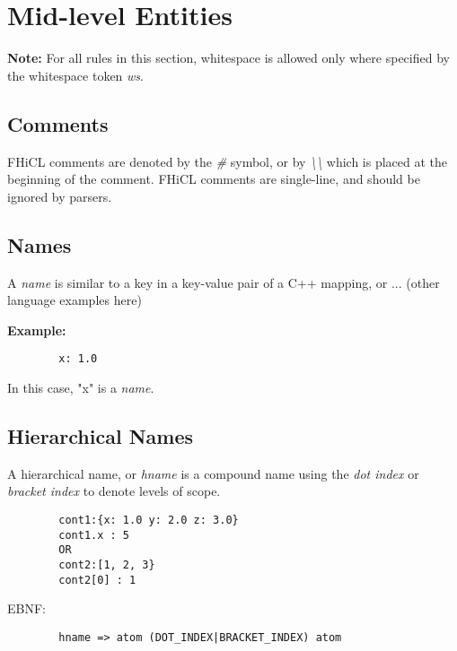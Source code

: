 \documentclass{memarticle}
\begin{document}
{        \section{Mid-level Entities}
                \textbf{ Note: } For all rules in this section,
                whitespace is allowed only where specified by the whitespace token \emph{ws}.
                \subsection{Comments}
                        FHiCL comments are denoted by the \emph{\#} symbol,
                        or by \emph{\textbackslash\textbackslash}
                        which is placed at the beginning of the comment.
                        FHiCL comments are single-line,
                        and should be ignored by parsers.
                \subsection{Names}
                        A \emph{name} is similar to a key in a key-value pair of a C++ mapping, or ... (other language examples here)
                        \par\textbf{Example:}
                        \begin{verbatim}
        x: 1.0
                        \end{verbatim}
                        In this case, 
                        "x" is a \emph{name}.
                \subsection{Hierarchical Names}
                        A hierarchical name,
                        or \emph{hname} is a compound name 
                        using the \emph{dot index}
                        or \emph{bracket index}
                        to denote levels of scope.
                        \begin{verbatim}
        cont1:{x: 1.0 y: 2.0 z: 3.0}
        cont1.x : 5
        OR
        cont2:[1, 2, 3}
        cont2[0] : 1
                        \end{verbatim}
                        \par
                        EBNF:
                        \begin{verbatim}
        hname => atom (DOT_INDEX|BRACKET_INDEX) atom
                        \end{verbatim}
        
}
\end{document}
